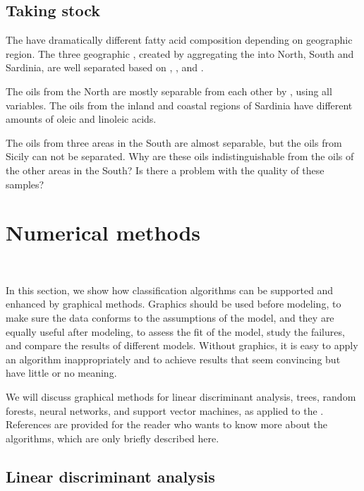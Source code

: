\subsection{Taking stock} 

The  have dramatically different fatty acid
composition depending on geographic region. The three geographic
, created by aggregating the  into North,
South and Sardinia, are well separated based on ,
, and .  


The oils from the North are mostly separable from each other by
, using all variables. The oils from the inland and coastal
regions of Sardinia have different amounts of oleic and linoleic
acids.

The oils from three areas in the South are almost separable, but the
oils from Sicily can not be separated.  Why are these oils
indistinguishable from the oils of the other areas in the South?  Is
there a problem with the quality of these samples?

\section{Numerical methods}~\label{class-num}

In this section, we show how classification algorithms can be
supported and enhanced by graphical methods.  Graphics should be used
before modeling, to make sure the data conforms to the assumptions of
the model, and they are equally useful after modeling, to assess the
fit of the model, study the failures, and compare the results of
different models.  Without graphics, it is easy to apply an algorithm
inappropriately and to achieve results that seem convincing but have
little or no meaning.

We will discuss graphical methods for linear discriminant analysis,
trees, random forests, neural networks, and support vector machines,
as applied to the .  References are provided for the
reader who wants to know more about the algorithms, which are only
briefly described here.


\subsection{Linear discriminant analysis}

